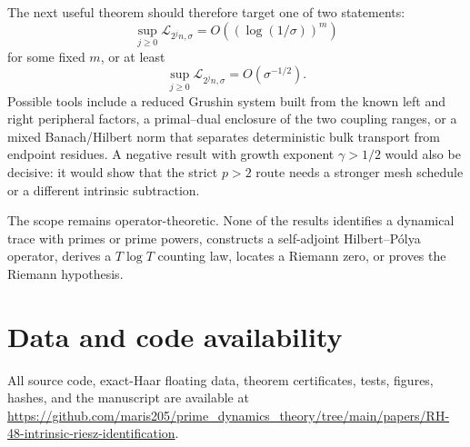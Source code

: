 \documentclass[11pt]{article}
\theoremstyle{definition}
\theoremstyle{remark}
\newcommand{\cL}{\mathcal L}
\begin{document}
The next useful theorem should therefore target one of two statements:
\begin{equation}
 \sup_{j\ge0}\cL_{2^jn,\sigma}
 =O((\log(1/\sigma))^m)
 \label{eq:next-polylog-target}
\end{equation}
for some fixed $m$, or at least
\begin{equation}
 \sup_{j\ge0}\cL_{2^jn,\sigma}
 =O(\sigma^{-1/2}).
 \label{eq:next-half-power-target}
\end{equation}
Possible tools include a reduced Grushin system built from the known left
and right peripheral factors, a primal--dual enclosure of the two coupling
ranges, or a mixed Banach/Hilbert norm that separates deterministic bulk
transport from endpoint residues.  A negative result with growth exponent
$\gamma>1/2$ would also be decisive: it would show that the strict $p>2$
route needs a stronger mesh schedule or a different intrinsic subtraction.

The scope remains operator-theoretic.  None of the results identifies a
dynamical trace with primes or prime powers, constructs a self-adjoint
Hilbert--P\'olya operator, derives a $T\log T$ counting law, locates a Riemann
zero, or proves the Riemann hypothesis.

\section*{Data and code availability}

All source code, exact-Haar floating data, theorem certificates, tests,
figures, hashes, and the manuscript are available at
\url{https://github.com/maris205/prime_dynamics_theory/tree/main/papers/RH-48-intrinsic-riesz-identification}.



\end{document}
